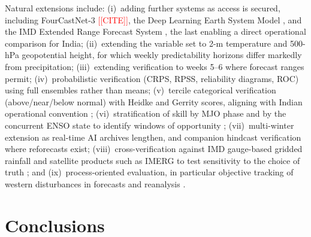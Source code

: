 \documentclass[11pt]{article}
\newcommand{\ph}[1]{\textcolor{red}{[#1]}}
\begin{document}
Natural extensions include: (i)~adding further systems as access is
secured, including FourCastNet-3 \ph{[CITE]}, the Deep Learning Earth
System Model \citep{cresswellclay2024}, and the IMD Extended Range
Forecast System \citep{pattanaik2019}, the last enabling a direct
operational comparison for India; (ii)~extending the variable set to
2-m temperature and 500-hPa geopotential height, for which weekly
predictability horizons differ markedly from precipitation;
(iii)~extending verification to weeks 5--6 where forecast ranges
permit; (iv)~probabilistic verification (CRPS, RPSS, reliability
diagrams, ROC) using full ensembles rather than means; (v)~tercile
categorical verification (above/near/below normal) with Heidke and
Gerrity scores, aligning with Indian operational convention
\citep{pattanaik2019,wilks2019}; (vi)~stratification of skill by MJO
phase \citep{wheelerhendon2004} and by the concurrent ENSO state to
identify windows of opportunity \citep{mariotti2020};
(vii)~multi-winter extension as real-time AI archives lengthen, and
companion hindcast verification where reforecasts exist;
(viii)~cross-verification against IMD gauge-based gridded rainfall
and satellite products such as IMERG to test sensitivity to the
choice of truth \citep{pai2014}; and (ix)~process-oriented
evaluation, in particular objective tracking of western disturbances
in forecasts and reanalysis \citep{hunt2018,dimri2015}.

\section{Conclusions}\label{sec:conclusions}
\end{document}

